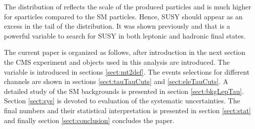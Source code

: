 The distribution of \mttwo reflects the scale of the produced particles and is much higher for sparticles
compared to the SM particles. Hence, SUSY should appear as an excess in the tail of the \mttwo distribution.
It was shown previously \cite{Khachatryan:2014qwa} and \cite{Chatrchyan:2012jx}    that \mttwo is a powerful variable to search for SUSY in both
 leptonic and hadronic final states.

The current paper is organized as follows, after introduction in the next section the CMS experiment  
and objects used in this analysis are introduced. The \mttwo variable is introduced in sections \ref{sect:mt2def}. 
The events selections for different channels are shown in sections \ref{sect:tauTauCuts} and \ref{sect:eleTauCuts}. 
A detailed study of the SM backgrounds is presented in section \ref{sect:bkgLepTau}. Section \ref{sect:sys} 
is devoted to evaluation of the systematic uncertainties. The final numbers and their statistical interpretation is presented in 
section \ref{sect:stat} and finally section \ref{sect:conclusion} concludes the paper.





